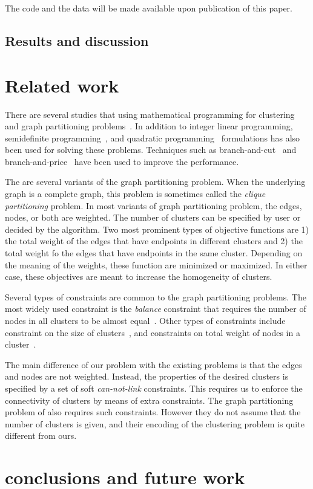 \documentclass[conference,compsoc]{IEEEtran}
\begin{document}


The code and the data will be made available upon publication of this paper.

\subsection{Results and discussion}

\section{Related work}
\label{sec:related}
There are several studies that using mathematical programming
for clustering and graph partitioning
problems~\cite{HansenJ97}. In addition to integer linear programming, semidefinite programming~\cite{ArmbrusterFHM08,LisserR03}, and quadratic programming~\cite{FanP10} formulations has also been used for solving these problems. Techniques such as branch-and-cut~\cite{FerreiraMSWW98,GrotschelW89} and branch-and-price~\cite{MehrotraT98,JiM07} have been used to improve the performance. 

The are several variants of the graph partitioning problem. When the underlying graph is a complete graph, this problem is sometimes called the \emph{clique partitioning} problem. In most variants of graph partitioning problem, the edges, nodes, or both are weighted. The number of clusters can be specified by user or decided by the algorithm. Two most prominent types of objective functions are 1) the total weight of the edges that have endpoints in different clusters and 2) the total weight fo the edges that have endpoints in the same cluster. Depending on the meaning of the weights, these function are minimized or maximized. In either case, these objectives are meant to increase the homogeneity of clusters.  

Several types of constraints are common to the graph partitioning problems. The most widely used constraint is the \emph{balance} constraint that requires the number of nodes in all clusters to be almost equal~\cite{LabbeO10}. Other types of constraints include constraint on the size of clusters~\cite{FanP10}, and constraints on total weight of nodes in a cluster~\cite{FerreiraMSWW98}. 

The main difference of our problem with the existing problems is that the edges and nodes are not weighted. Instead, the properties of the desired clusters is specified by a set of soft \emph{can-not-link} constraints. This requires us to enforce the connectivity of clusters by means of extra constraints. The graph partitioning problem of \cite{Benati2017} also requires such constraints. However they do not assume that the number of clusters is given, and their encoding of the clustering problem is quite different from ours. 


\section{conclusions and future work}
\label{sec:conclusion}



\end{document}
